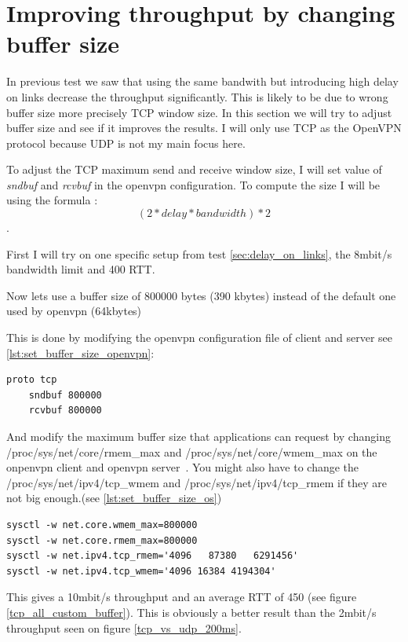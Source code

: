 \section{Improving throughput by changing buffer size} \label{sec:improving_throughput}

In previous test \label{sec:delay_on_links} we saw that using the same bandwith but introducing high delay on links decrease the throughput significantly.
This is likely to be due to wrong buffer size more precisely TCP window size.
In this section we will try to adjust buffer size and see if it improves  the results.
I will only use TCP as the OpenVPN protocol because UDP is not my main focus here.

To adjust the TCP maximum send and receive window size, I will set value of \textit{sndbuf} and \textit{rcvbuf} in the openvpn configuration.
To compute the size I will be using the formula : $$(2 * delay * bandwidth) * 2$$.

First I will try on one specific setup from test \ref{sec:delay_on_links}, the 8mbit/s bandwidth limit and 400 RTT.

Now lets use a buffer size of 800000 bytes (390 kbytes) instead of the default one used by openvpn (64kbytes)

This is done by modifying the openvpn configuration file of client and server see \ref{lst:set_buffer_size_openvpn}:

  \begin{lstlisting}[caption={Set buffer size OpenVPN configuration},label={lst:set_buffer_size_openvpn}]
	proto tcp
	sndbuf 800000
	rcvbuf 800000\end{lstlisting}

And modify the maximum buffer size that applications can request by changing /proc/sys/net/core/rmem\_max and /proc/sys/net/core/wmem\_max on the onpenvpn client and
openvpn server~\cite{tcptuning}. You might also have to change the /proc/sys/net/ipv4/tcp\_wmem and /proc/sys/net/ipv4/tcp\_rmem if they are not big enough.(see \ref{lst:set_buffer_size_os})

\begin{lstlisting}[caption={Set max buffer size},label={lst:set_buffer_size_os}]
sysctl -w net.core.wmem_max=800000
sysctl -w net.core.rmem_max=800000
sysctl -w net.ipv4.tcp_rmem='4096	87380	6291456'
sysctl -w net.ipv4.tcp_wmem='4096 16384	4194304'\end{lstlisting}

This gives a 10mbit/s throughput and an average RTT of 450 (see figure \ref{tcp_all_custom_buffer}). This is obviously a better result than the 2mbit/s throughput seen on figure \ref{tcp_vs_udp_200ms}.

